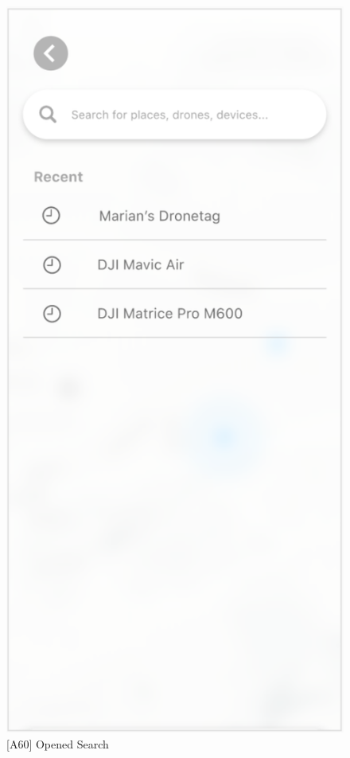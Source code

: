 \begin{figure}
    \centering
    \begin{minipage}{.45\textwidth}
        \centering
        \includegraphics[width=.7\linewidth]{assets/user_interface_design/search/opened_search.png}
        \caption{[A60] Opened Search}
        \label{fig:opened_search}
    \end{minipage}%
    \hspace{.05\linewidth}
    \begin{minipage}{.45\textwidth}
        \centering

\end{minipage}
\end{figure}
